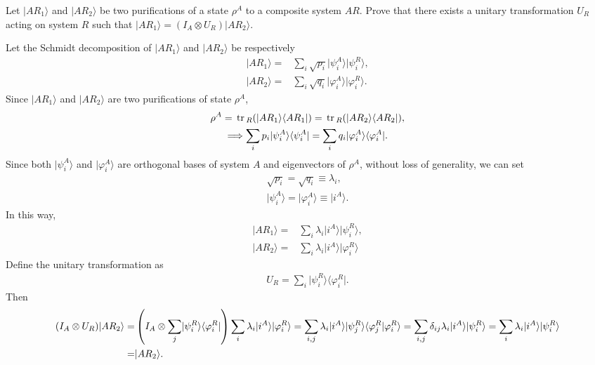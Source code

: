 \documentclass[en]{sol-man}
\begin{document}
\begin{exe}
    Let $\lvert AR_1\rangle$ and $\lvert AR_2\rangle$ be two purifications of a state $\rho^A$ to a composite system $AR$. Prove that there exists a unitary transformation $U_R$ acting on system $R$ such that $\lvert AR_1\rangle=(I_A\otimes U_R)\lvert AR_2\rangle$.
\end{exe}
\begin{pf}
    Let the Schmidt decomposition of $\lvert AR_1\rangle$ and $\lvert AR_2\rangle$ be respectively
    \begin{align}
        \lvert AR_1\rangle=&\sum_i\sqrt{p_i}\lvert\psi_i^A\rangle\lvert\psi_i^R\rangle,\\
        \lvert AR_2\rangle=&\sum_i\sqrt{q_i}\lvert\varphi_i^A\rangle\lvert\varphi_i^R\rangle.
    \end{align}
    Since $\lvert AR_1\rangle$ and $\lvert AR_2\rangle$ are two purifications of state $\rho^A$,
    \begin{gather}
        \rho^A=\,\mathrm{tr}\,_R(\lvert AR_1\rangle\langle AR_1\rvert)=\,\mathrm{tr}\,_R(\lvert AR_2\rangle\langle AR_2\rvert),\\
        \Longrightarrow\sum_ip_i\lvert\psi_i^A\rangle\langle\psi_i^A\rvert=\sum_iq_i\lvert\varphi_i^A\rangle\langle\varphi_i^A\rvert.
    \end{gather}
    Since both $\lvert\psi_i^A\rangle$ and $\lvert\varphi_i^A\rangle$ are orthogonal bases of system $A$ and eigenvectors of $\rho^A$, without loss of generality, we can set
    \begin{gather}
        \sqrt{p_i}=\sqrt{q_i}\equiv\lambda_i,\\
        \lvert\psi_i^A\rangle=\lvert\varphi_i^A\rangle\equiv\lvert i^A\rangle.
    \end{gather}
    In this way,
    \begin{align}
        \lvert AR_1\rangle=&\sum_i\lambda_i\lvert i^A\rangle\lvert\psi_i^R\rangle,\\
        \lvert AR_2\rangle=&\sum_i\lambda_i\lvert i^A\rangle\lvert\varphi_i^R\rangle
    \end{align}
    Define the unitary transformation as
    \begin{align}
        U_R=\sum_i\lvert\psi_i^R\rangle\langle\varphi_i^R\rvert.
    \end{align}
    Then
    \begin{align}
        \notag(I_A\otimes U_R)\lvert AR_2\rangle=&\left(I_A\otimes\sum_j\lvert\psi_i^R\rangle\langle\varphi_i^R\rvert\right)\sum_i\lambda_i\lvert i^A\rangle\lvert\varphi_i^R\rangle=\sum_{i,j}\lambda_i\lvert i^A\rangle\lvert\psi_j^R\rangle\langle\varphi_j^R\vert\varphi_i^R\rangle=\sum_{i,j}\delta_{ij}\lambda_i\lvert i^A\rangle\lvert\psi_i^R\rangle=\sum_i\lambda_i\lvert i^A\rangle\lvert\psi_i^R\rangle\\
        =&\lvert AR_2\rangle.
    \end{align}
\end{pf}
\end{document}
